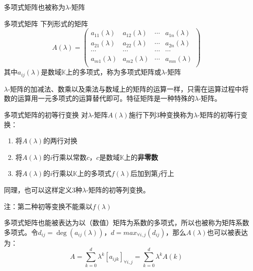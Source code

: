 多项式矩阵也被称为$\lambda$-矩阵

\begin{definition}{多项式矩阵}
下列形式的矩阵
$$A(\lambda)=\begin{pmatrix}
a_{11}(\lambda) & a_{12}(\lambda) & \cdots & a_{1n}(\lambda) \\
a_{21}(\lambda) & a_{22}(\lambda) & \cdots & a_{2n}(\lambda) \\
\cdots          & \cdots          & \cdots & \cdots          \\
a_{m1}(\lambda) & a_{m2}(\lambda) & \cdots & a_{mn}(\lambda) \\
\end{pmatrix}$$
其中$a_{ij}(\lambda)$是数域$\mathbb{K}$上的多项式，称为多项式矩阵或$\lambda$-矩阵
\end{definition}


$\lambda$-矩阵的加减法、数乘以及乘法与数域上的矩阵的运算一样，只需在运算过程中将数的运算用一元多项式的运算替代即可。特征矩阵是一种特殊的$\lambda$-矩阵。

\begin{definition}{多项式矩阵的初等行变换}
对$\lambda$-矩阵$A(\lambda)$施行下列3种变换称为$\lambda$-矩阵的初等行变换：
\begin{enumerate}
\item 将$A(\lambda)$的两行对换
\item 将$A(\lambda)$的$i$行乘以常数$c$，$c$是数域$\mathbb{K}$上的\textbf{非零数}
\item 将$A(\lambda)$的$i$行乘以$\mathbb{K}$上的多项式$f(\lambda)$后加到第$j$行上
\end{enumerate}
同理，也可以这样定义3种$\lambda$-矩阵的初等列变换。
\end{definition}

注：第二种初等变换不能乘以$f(\lambda)$

多项式矩阵也能被表达为以（数值）矩阵为系数的多项式，所以也被称为矩阵系数多项式。令$d_{ij}=\deg(a_{ij}(\lambda))$，$d=max_{\forall{i,j}}(d_{ij})$，那么$A(\lambda)$也可以被表达为：
\begin{equation}
A=\sum_{k=0}^d\lambda^k[a_{ijk}]_{\forall{i,j}}=\sum_{k=0}^d\lambda^kA(k)
\end{equation}
